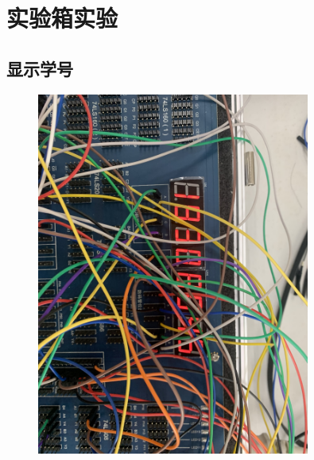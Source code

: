 \documentclass[UTF8, a4paper, 11pt]{article}
\begin{document}
\section{实验箱实验}
\subsection{显示学号}
\begin{figure}[H]
    \centering
    \includegraphics[width=0.8\textwidth]{学号.jpg}
\end{figure}
%
%
\end{document}

